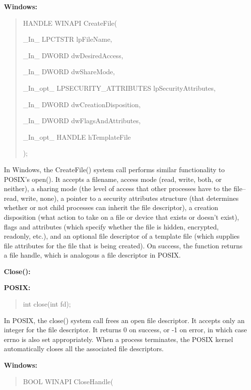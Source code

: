 \documentclass[letterpaper,10pt,titlepage]{article}
\newcommand{\tab}{\hspace*{2em}} %
\begin{document}
\begin{enumerate}
\textbf{Windows:}

\begin{quote}
HANDLE WINAPI CreateFile(

\tab\_In\_      LPCTSTR lpFileName,

\tab\_In\_      DWORD dwDesiredAccess,

\tab\_In\_      DWORD dwShareMode,

\tab\_In\_opt\_  LPSECURITY\_ATTRIBUTES lpSecurityAttributes,

\tab\_In\_      DWORD dwCreationDisposition,

\tab\_In\_      DWORD dwFlagsAndAttributes,

\tab\_In\_opt\_  HANDLE hTemplateFile

);
\end{quote}


\tab In Windows, the CreateFile() system call performs similar functionality to POSIX's open(). It accepts a filename, access mode (read, write, both, or neither), a sharing mode (the level of access that other processes have to the file--read, write, none), a pointer to a security attributes structure (that determines whether or not child processes can inherit the file descriptor), a creation disposition (what action to take on a file or device that exists or doesn't exist), flags and attributes (which specify whether the file is hidden, encrypted, readonly, etc.), and an optional file descriptor of a template file (which supplies file attributes for the file that is being created). On success, the function returns a file handle, which is analogous a file descriptor in POSIX. \newline  


\textbf{Close():}

\textbf{POSIX:}

\begin{quote}
int close(int fd);
\end{quote}

\tab In POSIX, the close() system call frees an open file descriptor. It accepts only an integer for the file descriptor. It returns 0 on success, or -1 on error, in which case errno is also set appropriately. When a process terminates, the POSIX kernel automatically closes all the associated file descriptors.\newline

\textbf{Windows:} 

\begin{quote}
BOOL WINAPI CloseHandle(


\end{quote}
\end{enumerate}
\end{document}
